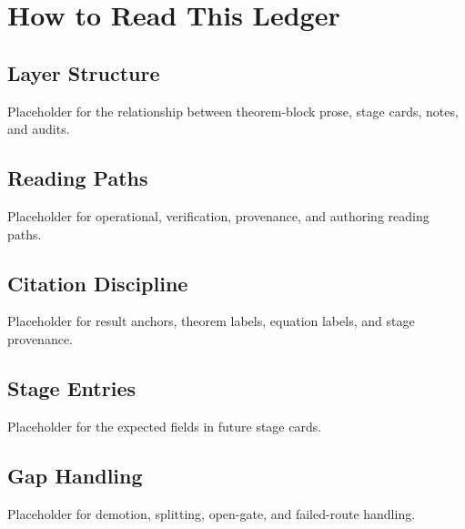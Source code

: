 \chapter{How to Read This Ledger}
\label{chap:how-to-read}


\section{Layer Structure}
\label{sec:how-to-read-layer-structure}

Placeholder for the relationship between theorem-block prose, stage cards, notes, and audits.

\section{Reading Paths}
\label{sec:how-to-read-reading-paths}

Placeholder for operational, verification, provenance, and authoring reading paths.

\section{Citation Discipline}
\label{sec:how-to-read-citation-discipline}

Placeholder for result anchors, theorem labels, equation labels, and stage provenance.

\section{Stage Entries}
\label{sec:how-to-read-stage-entries}

Placeholder for the expected fields in future stage cards.

\section{Gap Handling}
\label{sec:how-to-read-gap-handling}

Placeholder for demotion, splitting, open-gate, and failed-route handling.
